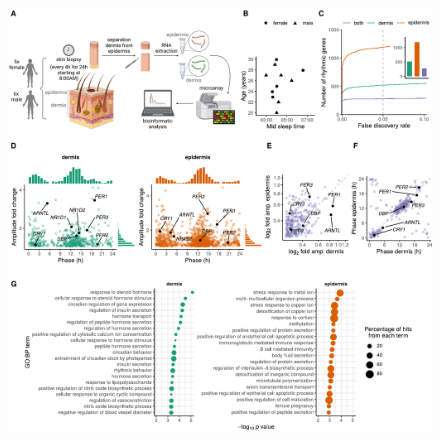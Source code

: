 \begin{figure}[b!]
	\begin{center}
		\includegraphics[scale=0.55]{./Figures/fig1_complete_ext.pdf}

\end{center}
\end{figure}

